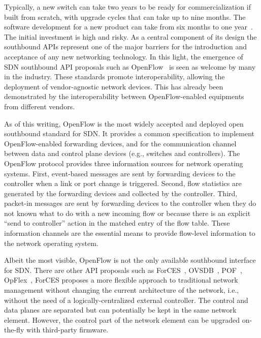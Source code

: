 Typically, a new switch can take two years to be ready for commercialization if built from scratch, 
with upgrade cycles that can take up to nine months. The software development for a new product can 
take from six months to one year~\cite{kato2013}. The initial investment 
is high and risky. 
As a central component of its design the southbound APIs represent one of the major barriers for the introduction 
and acceptance of any new networking technology. 
In this light, the emergence of SDN southbound API proposals such as OpenFlow~\cite{mckeown2008} is seen as welcome by many in the industry.
These standards promote interoperability, allowing the deployment of vendor-agnostic network devices. 
This has already been demonstrated by the interoperability between OpenFlow-enabled equipments from different vendors.

As of this writing, OpenFlow is the most widely accepted and deployed open southbound standard 
for SDN. It provides a common specification to implement OpenFlow-enabled forwarding devices, and for the
communication channel between data and control plane devices (e.g., switches and controllers).
The OpenFlow protocol provides three information sources for network operating systems.
First, event-based messages are sent by forwarding devices to the controller when a link or port 
change is triggered. Second, flow statistics are generated by the forwarding devices and collected 
by the controller. Third, packet-in messages are sent by forwarding devices to the controller when 
they do not known what to do with a new incoming flow or because there is an explicit ``send to 
controller'' action in the matched entry of the flow table. These information channels are the essential 
means to provide flow-level information to the network operating system.

Albeit the most visible, OpenFlow is not the only available southbound interface for SDN.
There are other API proposals such as ForCES~\cite{doria2010}, OVSDB~\cite{pfaff2013-1}, POF~\cite{song2013,song2013-1}, OpFlex~\cite{smith2014}, 
ForCES proposes a more flexible approach to traditional network management without changing the current architecture of the network, i.e., without the need of a logically-centralized external controller. 
The control and data planes are separated but can potentially be kept in the same network element.
However, the control part of the network element can be upgraded on-the-fly with third-party firmware.

